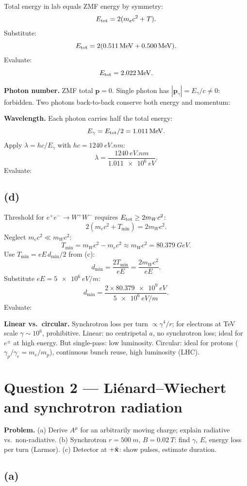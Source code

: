 \documentclass[11pt]{article}
\begin{document}
Total energy in lab equals ZMF energy by symmetry:
\[ E_{\rm tot} = 2(m_ec^2 + T). \]
Substitute:
\[ E_{\rm tot} = 2(\SI{0.511}{MeV}+\SI{0.500}{MeV}). \]
Evaluate:
\[ E_{\rm tot} = \SI{2.022}{MeV}. \]

\textbf{Photon number.} ZMF total $\bm p=0$. Single photon has $|\bm p_\gamma|=E_\gamma/c\neq 0$: forbidden. Two photons back-to-back conserve both energy and momentum:

\textbf{Wavelength.} Each photon carries half the total energy:
\[ E_\gamma = E_{\rm tot}/2 = \SI{1.011}{MeV}. \]
Apply $\lambda = hc/E_\gamma$ with $hc=\SI{1240}{eV.nm}$:
\[ \lambda = \frac{\SI{1240}{eV.nm}}{\SI{1.011e6}{eV}}. \]
Evaluate:

\subsection*{(d)}

Threshold for $e^+e^-\to W^+W^-$ requires $E_{\rm tot}\ge 2m_W c^2$:
\[ 2(m_ec^2 + T_{\min}) = 2 m_W c^2. \]
Neglect $m_e c^2 \ll m_W c^2$:
\[ T_{\min} = m_W c^2 - m_e c^2 \approx m_W c^2 = \SI{80.379}{GeV}. \]
Use $T_{\min}=eE\,d_{\min}/2$ from (c):
\[ d_{\min} = \frac{2 T_{\min}}{eE} = \frac{2 m_W c^2}{eE}. \]
Substitute $eE=\SI{5e6}{eV/m}$:
\[ d_{\min} = \frac{2\times\SI{80.379e9}{eV}}{\SI{5e6}{eV/m}}. \]
Evaluate:

\textbf{Linear vs.\ circular.} Synchrotron loss per turn $\propto \gamma^4/r$; for electrons at TeV scale $\gamma\sim 10^6$, prohibitive. Linear: no centripetal $a$, no synchrotron loss; ideal for $e^\pm$ at high energy. But single-pass: low luminosity. Circular: ideal for protons ($\gamma_p/\gamma_e = m_e/m_p$), continuous bunch reuse, high luminosity (LHC).

\section*{Question 2 --- Liénard--Wiechert and synchrotron radiation}

\textbf{Problem.} (a) Derive $A^\mu$ for an arbitrarily moving charge; explain radiative vs.\ non-radiative. (b) Synchrotron $r=\SI{500}{m}$, $B=\SI{0.02}{T}$: find $\gamma$, $E$, energy loss per turn (Larmor). (c) Detector at $+\hat{\vb x}$: show pulses, estimate duration.

\subsection*{(a)}
\end{document}
